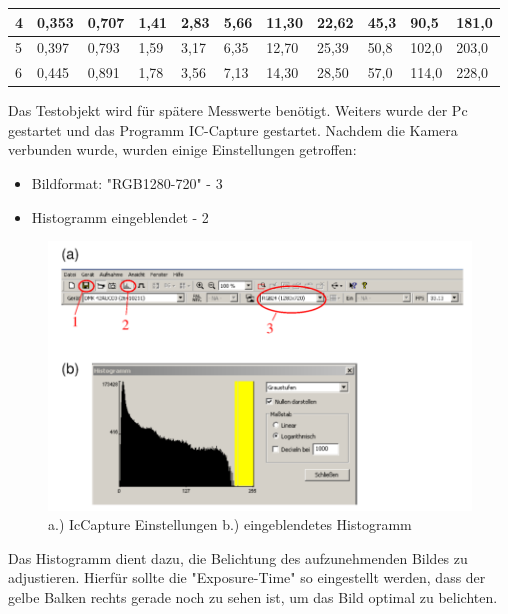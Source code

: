\documentclass[12pt,a4paper,twoside]{article}
\begin{document}
\begin{table}[H]
\begin{tabular}{|l|llllllllll|}
    4           & \multicolumn{1}{l|}{0,353} & \multicolumn{1}{l|}{0,707} & \multicolumn{1}{l|}{1,41} & \multicolumn{1}{l|}{2,83} & \multicolumn{1}{l|}{5,66} & \multicolumn{1}{l|}{11,30} & \multicolumn{1}{l|}{22,62} & \multicolumn{1}{l|}{45,3} & \multicolumn{1}{l|}{90,5}  & 181,0 \\ \hline
    5           & \multicolumn{1}{l|}{0,397} & \multicolumn{1}{l|}{0,793} & \multicolumn{1}{l|}{1,59} & \multicolumn{1}{l|}{3,17} & \multicolumn{1}{l|}{6,35} & \multicolumn{1}{l|}{12,70} & \multicolumn{1}{l|}{25,39} & \multicolumn{1}{l|}{50,8} & \multicolumn{1}{l|}{102,0} & 203,0 \\ \hline
    6           & \multicolumn{1}{l|}{0,445} & \multicolumn{1}{l|}{0,891} & \multicolumn{1}{l|}{1,78} & \multicolumn{1}{l|}{3,56} & \multicolumn{1}{l|}{7,13} & \multicolumn{1}{l|}{14,30} & \multicolumn{1}{l|}{28,50} & \multicolumn{1}{l|}{57,0} & \multicolumn{1}{l|}{114,0} & 228,0 \\ \hline
\end{tabular}
\end{table}

\noindent
Das Testobjekt wird für spätere Messwerte benötigt. Weiters wurde der Pc gestartet und das Programm IC-Capture gestartet. Nachdem die Kamera verbunden wurde, wurden einige Einstellungen getroffen:

\begin{itemize}
    \item Bildformat: "RGB1280-720" - 3
    \item Histogramm eingeblendet - 2
\end{itemize}

\begin{figure}[H]
    \centering
    \includegraphics[width=0.5\linewidth]{nudes/IcCaptureSettings.png}
    \caption{a.) IcCapture Einstellungen b.) eingeblendetes Histogramm}
    \label{fig:IcCaptureSettings}
\end{figure}

\noindent
Das Histogramm dient dazu, die Belichtung des aufzunehmenden Bildes zu adjustieren. Hierfür sollte die "Exposure-Time" so eingestellt werden, dass der gelbe Balken rechts gerade noch zu sehen ist, um das Bild optimal zu belichten.
\end{document}
